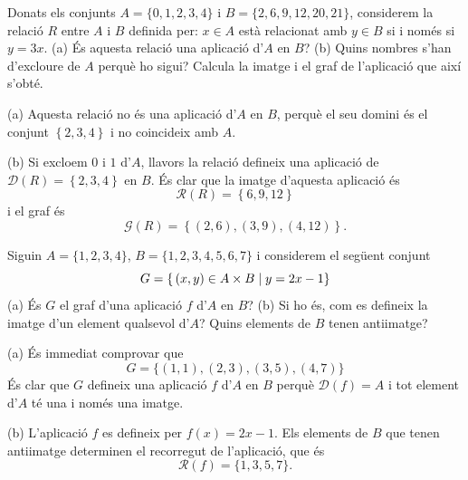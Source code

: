 \begin{exemple}
Donats els conjunts $A=\{0,1,2,3,4\}$ i $B=\{2,6,9,12,20,21\}$, considerem
la relació $R$ entre $A$ i $B$ definida per: $x\in A$ està
relacionat amb $y\in B$ si i només si $y=3x$. (a) És aquesta relació una aplicació d'$A$ en $B$? (b) Quins nombres s'han d'excloure
de $A$ perquè ho sigui? Calcula la imatge i el graf de l'aplicació
que així s'obté.
\end{exemple}

\begin{solucio}
(a) Aquesta relació no és una aplicació d'$A$ en $B$, perquè
el seu domini és el conjunt $\left\{ 2,3,4\right\} $ i no coincideix amb
$A$.

(b) Si excloem $0$ i $1$ d'$A$, llavors la relació defineix una aplicació de $\mathcal{D}(R)=\left\{ 2,3,4\right\} $ en $B$. És clar que la
imatge d'aquesta aplicació és%
\begin{equation*}
\mathcal{R}(R)=\left\{ 6,9,12\right\}
\end{equation*}
i el graf és%
\begin{equation*}
\mathcal{G}(R)=\left\{ (2,6),(3,9),(4,12)\right\} \text{.}
\end{equation*}
\end{solucio}

\begin{exemple}
Siguin $A=\{1,2,3,4\}$, $B=\{1,2,3,4,5,6,7\}$ i considerem el següent
conjunt%
\begin{equation*}
G=\{\text{\thinspace}(x,y)\in A\times B\mid y=2x-1\}
\end{equation*}
(a) És $G$ el graf d'una aplicació $f$ d'$A$ en $B$? (b) Si ho és, com es defineix la imatge d'un element qualsevol d'$A$? Quins elements de
$B$ tenen antiimatge?
\end{exemple}

\begin{solucio}
(a) És immediat comprovar que%
\begin{equation*}
G=\{(1,1),(2,3),(3,5),(4,7)\}
\end{equation*}
És clar que $G$ defineix una aplicació $f$ d'$A$ en $B$ perquè $%
\mathcal{D}(f)=A$ i tot element d'$A$ té una i només una imatge.

(b) L'aplicació $f$ es defineix per $f(x)=2x-1$. Els elements de $B$ que
tenen antiimatge determinen el recorregut de l'aplicació, que és
\begin{equation*}
\mathcal{R}(f)=\{1,3,5,7\}\text{.}
\end{equation*}
\end{solucio}

